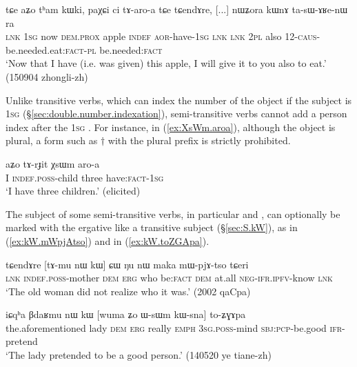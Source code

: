 \begin{exe}
\ex \label{ex:paXCi.ci.taroa}
\gll  tɕe aʑo tʰam kɯki, paχɕi ci tɤ-aro-a tɕe tɕendɤre, 
[...] nɯʑora kɯnɤ ta-sɯ-ɤʁe-nɯ ra \\
\textsc{lnk} \textsc{1sg} now \textsc{dem}.\textsc{prox} apple \textsc{indef} \textsc{aor}-have-\textsc{1sg} \textsc{lnk} \textsc{lnk} { } \textsc{2pl} also 1\fl{}2-\textsc{caus}-be.needed.eat:\textsc{fact}-\textsc{pl} be.needed:\textsc{fact} \\
\glt `Now that I have (i.e. was given) this apple, I will give it to you also to eat.' (150904 zhongli-zh)
\end{exe}

Unlike transitive verbs, which can index the number of the object if the subject is \textsc{1sg} (§\ref{sec:double.number.indexation}), semi-transitive verbs cannot add a person index after the \textsc{1sg} . For instance, in (\ref{ex:XsWm.aroa}), although the object is plural, a form such as $\dagger$ with the  plural prefix is strictly prohibited. 

\begin{exe}
\ex   \label{ex:XsWm.aroa}
 \gll aʑo tɤ-rɟit χsɯm aro-a   \\
I \textsc{indef}.\textsc{poss}-child three have:\textsc{fact}-\textsc{1sg} \\
 \glt `I have three children.' (elicited)
\end{exe} 

The subject of some semi-transitive verbs, in particular  and , can optionally be marked with the ergative like a transitive subject (§\ref{sec:S.kW}), as  in (\ref{ex:kW.mWpjAtso}) and  in (\ref{ex:kW.toZGApa}). 

\begin{exe}
\ex   \label{ex:kW.mWpjAtso}
 \gll  tɕendɤre [tɤ-mu nɯ kɯ] ɕɯ ŋu nɯ maka mɯ-pjɤ-tso tɕeri \\
\textsc{lnk} \textsc{indef}.\textsc{poss}-mother \textsc{dem} \textsc{erg} who be:\textsc{fact} \textsc{dem} at.all \textsc{neg}-\textsc{ifr}.\textsc{ipfv}-know \textsc{lnk} \\
\glt `The old woman did not realize who it was.' (2002 qaCpa)
\end{exe}

\begin{exe}
\ex   \label{ex:kW.toZGApa}
 \gll iɕqʰa βdaʁmu nɯ kɯ [wuma ʑo ɯ-sɯm kɯ-sna] to-ʑɣɤpa \\
 the.aforementioned lady \textsc{dem} \textsc{erg} really \textsc{emph} \textsc{3sg}.\textsc{poss}-mind \textsc{sbj}:\textsc{pcp}-be.good \textsc{ifr}-pretend \\
 \glt `The lady pretended to be a good person.' (140520 ye tiane-zh) 
\end{exe}


